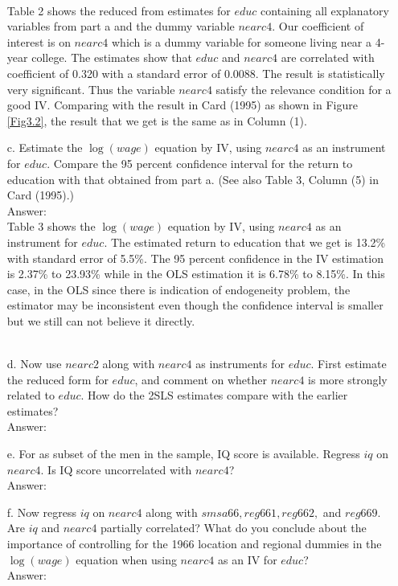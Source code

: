 \documentclass[10pt]{article}
\begin{document}
\begin{enumerate}
\begin{figure}[h]
\end{figure}\\
Table 2 shows the reduced from estimates for $educ$ containing all explanatory variables from part a and the dummy variable $nearc4.$ Our coefficient of interest is on $nearc4$ which is a dummy variable for someone living near a 4-year college. The estimates show that $educ$ and $nearc4$ are correlated with coefficient of 0.320 with a standard error of 0.0088. The result is statistically very significant. Thus the variable $nearc4$ satisfy the relevance condition for a good IV. Comparing with the result in Card (1995) as shown in Figure \ref{Fig3.2}, the result that we get is the same as in Column (1).
\\


\item[c.] Estimate the $\log(wage)$ equation by IV, using $nearc4$ as an instrument for $educ.$ Compare the 95 percent confidence interval for the return to education with that obtained from part a. (See also Table 3, Column (5) in Card (1995).)
\\ Answer:\\
Table 3 shows the $\log(wage)$ equation by IV, using $nearc4$ as an instrument for $educ.$ The estimated return to education that we get is 13.2\% with standard error of 5.5\%. The 95 percent confidence in the IV estimation is 2.37\% to 23.93\% while in the OLS estimation it is 6.78\% to 8.15\%. In this case, in the OLS since there is indication of endogeneity problem, the estimator may be inconsistent even though the confidence interval is smaller but we still can not believe it directly. 
\\ \\





\item[d.] Now use $nearc2$ along with $nearc4$ as instruments for $educ$. First estimate the reduced form for $educ$, and comment on whether $nearc4$ is more strongly related to $educ$. How do the 2SLS estimates compare with the earlier estimates?
\\ Answer:\\

\item[e.] For as subset of the men in the sample, IQ score is available. Regress $iq$ on $nearc4.$ Is IQ score uncorrelated with $nearc4$?
\\ Answer:\\

\item[f.] Now regress $iq$ on $nearc4$ along with $smsa66, reg661, reg662,$ and $reg669.$ Are $iq$ and $nearc4$ partially correlated? What do you conclude about the importance of controlling for the 1966 location and regional dummies in the $\log(wage)$ equation when using $nearc4$ as an IV for $educ$?
\\ Answer:\\

\end{enumerate}
\end{document}
